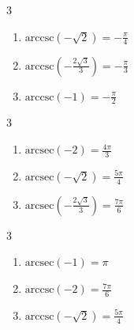 \documentclass{ximera}
\begin{document}
\begin{multicols}{3} 

\begin{enumerate}

\setcounter{enumi}{\value{HW}}


\item $\mbox{arccsc} \left( -\sqrt{2} \right) = -\frac{\pi}{4}$ 
\item $\mbox{arccsc} \left( -\frac{2\sqrt{3}}{3} \right) = -\frac{\pi}{3}$
\item $\mbox{arccsc} \left( -1 \right) = -\frac{\pi}{2}$ 

\setcounter{HW}{\value{enumi}}

\end{enumerate}

\end{multicols}

\begin{multicols}{3} 

\begin{enumerate}

\setcounter{enumi}{\value{HW}}

\item $\mbox{arcsec} \left( -2 \right) = \frac{4\pi}{3}$ 
\item $\mbox{arcsec} \left( -\sqrt{2} \right) = \frac{5\pi}{4}$ 
\item $\mbox{arcsec} \left( -\frac{2\sqrt{3}}{3} \right) = \frac{7\pi}{6}$ 

\setcounter{HW}{\value{enumi}}

\end{enumerate}

\end{multicols}

\begin{multicols}{3} 

\begin{enumerate}

\setcounter{enumi}{\value{HW}}


\item $\mbox{arcsec} \left( -1 \right) = \pi$ 
\item $\mbox{arccsc} \left( -2 \right) = \frac{7\pi}{6}$ 
\item $\mbox{arccsc} \left( -\sqrt{2} \right) = \frac{5\pi}{4}$ 

\setcounter{HW}{\value{enumi}}

\end{enumerate}

\end{multicols}
\end{document}
